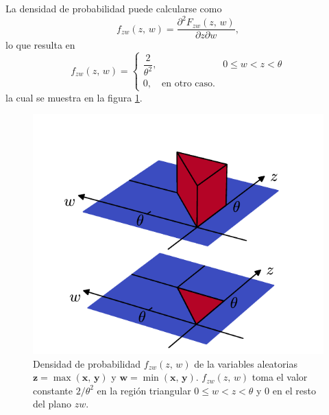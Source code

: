 \documentclass[a4paper]{report}
\newcommand{\x}{\mathbf{x}}
\newcommand{\y}{\mathbf{y}}
\newcommand{\w}{\mathbf{w}}
\newcommand{\z}{\mathbf{z}}
\begin{document}
La densidad de probabilidad puede calcularse como
\[
 f_{zw}(z,\,w)=\frac{\partial^2F_{zw}(z,\,w)}{\partial z\partial w},
\]
lo que resulta en
\[
 f_{zw}(z,\,w)=\left\{\begin{array}{ll}
  \dfrac{2}{\theta^2},& 0\leq w<z<\theta\\
  0, \quad\textrm{en otro caso.}
 \end{array} \right.
\]
la cual se muestra en la figura \ref{fig:joint_density_function_rv_min_max_surface_v2}.
\begin{figure}[!htb]
  \begin{minipage}[c]{0.5\textwidth}
    \includegraphics[width=\textwidth]{figuras/joint_density_function_rv_min_max_surface_v2.pdf}
  \end{minipage}\hfill
  \begin{minipage}[c]{0.42\textwidth}
    \caption{
       Densidad de probabilidad \(f_{zw}(z,\,w)\) de la variables aleatorias \(\z=\max(\x,\,\y)\) y \(\w=\min(\x,\,\y)\). \(f_{zw}(z,\,w)\) toma el valor constante \(2/\theta^2\) en la región triangular \(0\leq w<z<\theta\)  y 0 en el resto del plano \(zw\).
    } \label{fig:joint_density_function_rv_min_max_surface_v2}
  \end{minipage}
\end{figure}
\end{document}
